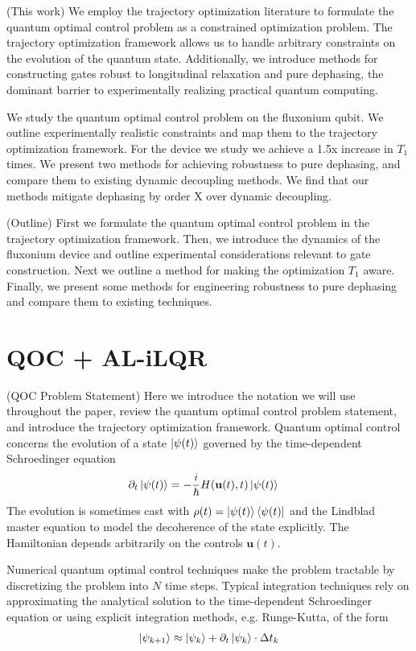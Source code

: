 \documentclass[
  amsfonts,
  amsmath,
  tbtags,
  amssymb,
  aps,
  nobibnotes,
  prl,
  twocolumn,
]{revtex4-2}
\begin{document}
(This work) We employ the trajectory optimization
literature to formulate the quantum
optimal control problem as a constrained optimization problem.
The trajectory optimization framework allows us to handle arbitrary
constraints on the evolution of the quantum state. Additionally,
we introduce methods for constructing gates robust to longitudinal
relaxation and pure dephasing, the dominant barrier to experimentally
realizing practical quantum computing.

We study the quantum optimal control problem on the fluxonium qubit.
We outline experimentally realistic constraints and map them to
the trajectory optimization framework. For the device we study
we achieve a 1.5x increase in $T_{1}$ times.
We present two methods for achieving robustness to pure dephasing,
and compare them to existing dynamic decoupling methods. We find that 
our methods mitigate dephasing by order X over dynamic decoupling.

(Outline)  First we formulate the quantum optimal control problem
in the trajectory optimization framework. Then, we introduce the dynamics
of the fluxonium device and outline experimental considerations
relevant to gate construction. Next we outline a method for
making the optimization $T_{1}$ aware. Finally, we present
some methods for engineering robustness to pure dephasing and
compare them to existing techniques.


\section{QOC + AL-iLQR}
(QOC Problem Statement) Here we introduce the notation
we will use throughout the paper,
review the quantum optimal control problem statement,
and introduce the trajectory optimization framework.
Quantum optimal control concerns the evolution of
a state $\ket{\psi(t)}$ governed by the time-dependent
Schroedinger equation
\begin{align}
  \partial_{t} \ket{\psi(t)} &= -\frac{i}{\hbar} H(\textbf{u}(t), t) \ket{\psi(t)}
\end{align}
The evolution is sometimes cast with $\rho(t) = \ket{\psi(t)}\bra{\psi(t)}$
and the Lindblad master equation to model the decoherence of the
state explicitly. The Hamiltonian
depends arbitrarily on the controls $\textbf{u}(t)$.

Numerical quantum optimal control techniques make
the problem tractable by discretizing the problem into $N$
time steps. Typical integration techniques rely on approximating
the analytical solution to the time-dependent Schroedinger equation
or using explicit integration methods, e.g. Runge-Kutta, of the form
\begin{align}
  \ket{\psi_{k + 1}} \approx \ket{\psi_{k}} + \partial_{t} \ket{\psi_{k}} \cdot \Delta t_{k}
\end{align}
\end{document}

